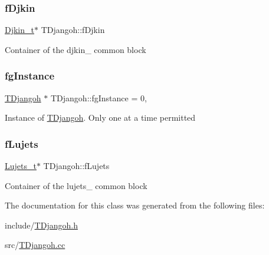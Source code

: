 \subsubsection{\texorpdfstring{f\+Djkin}{fDjkin}}
{\footnotesize\ttfamily \hyperlink{struct_djkin__t}{Djkin\+\_\+t}$\ast$ T\+Djangoh\+::f\+Djkin\hspace{0.3cm}{\ttfamily [protected]}}

Container of the djkin\+\_\+ common block \mbox{\label{class_t_djangoh_ad154e9fce28f84ab490dc6508db58fb8}} 
\subsubsection{\texorpdfstring{fg\+Instance}{fgInstance}}
{\footnotesize\ttfamily \hyperlink{class_t_djangoh}{T\+Djangoh} $\ast$ T\+Djangoh\+::fg\+Instance = 0\hspace{0.3cm}{\ttfamily [static]}, {\ttfamily [protected]}}

Instance of \hyperlink{class_t_djangoh}{T\+Djangoh}. Only one at a time permitted \mbox{\label{class_t_djangoh_a844cd27abcd743028fb98b3fba0c0fa9}} 
\subsubsection{\texorpdfstring{f\+Lujets}{fLujets}}
{\footnotesize\ttfamily \hyperlink{struct_lujets__t}{Lujets\+\_\+t}$\ast$ T\+Djangoh\+::f\+Lujets\hspace{0.3cm}{\ttfamily [protected]}}

Container of the lujets\+\_\+ common block 

The documentation for this class was generated from the following files\+:\begin{DoxyCompactItemize}
\item 
include/\hyperlink{_t_djangoh_8h}{T\+Djangoh.\+h}\item 
src/\hyperlink{_t_djangoh_8cc}{T\+Djangoh.\+cc}\end{DoxyCompactItemize}
